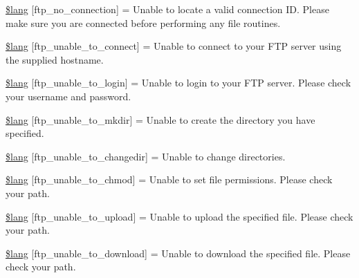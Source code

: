 \begin{DoxyCompactItemize}
\item 
\mbox{\hyperlink{ftp__lang_8php_af32ae700eb8c6446a6b393f025207123}{\$lang}} \mbox{[}\textquotesingle{}ftp\+\_\+no\+\_\+connection\textquotesingle{}\mbox{]} = \textquotesingle{}Unable to locate a valid connection I\+D. Please make sure you are connected before performing any file routines.\textquotesingle{}
\item 
\mbox{\hyperlink{ftp__lang_8php_a5a2916d207a12fc234432617f6bfe16c}{\$lang}} \mbox{[}\textquotesingle{}ftp\+\_\+unable\+\_\+to\+\_\+connect\textquotesingle{}\mbox{]} = \textquotesingle{}Unable to connect to your F\+TP server using the supplied hostname.\textquotesingle{}
\item 
\mbox{\hyperlink{ftp__lang_8php_ab8accd066e5113d6964f8a66bffadd2b}{\$lang}} \mbox{[}\textquotesingle{}ftp\+\_\+unable\+\_\+to\+\_\+login\textquotesingle{}\mbox{]} = \textquotesingle{}Unable to login to your F\+TP server. Please check your username and password.\textquotesingle{}
\item 
\mbox{\hyperlink{ftp__lang_8php_a1b9aef89edd203147bc526cad9cce4bf}{\$lang}} \mbox{[}\textquotesingle{}ftp\+\_\+unable\+\_\+to\+\_\+mkdir\textquotesingle{}\mbox{]} = \textquotesingle{}Unable to create the directory you have specified.\textquotesingle{}
\item 
\mbox{\hyperlink{ftp__lang_8php_a992dca1be963ab5d3ba070bfc2cd1cd3}{\$lang}} \mbox{[}\textquotesingle{}ftp\+\_\+unable\+\_\+to\+\_\+changedir\textquotesingle{}\mbox{]} = \textquotesingle{}Unable to change directories.\textquotesingle{}
\item 
\mbox{\hyperlink{ftp__lang_8php_a3329c4f515930936620f39a213dd3686}{\$lang}} \mbox{[}\textquotesingle{}ftp\+\_\+unable\+\_\+to\+\_\+chmod\textquotesingle{}\mbox{]} = \textquotesingle{}Unable to set file permissions. Please check your path.\textquotesingle{}
\item 
\mbox{\hyperlink{ftp__lang_8php_ae1f02f1304d517603128c96c70b7209b}{\$lang}} \mbox{[}\textquotesingle{}ftp\+\_\+unable\+\_\+to\+\_\+upload\textquotesingle{}\mbox{]} = \textquotesingle{}Unable to upload the specified file. Please check your path.\textquotesingle{}
\item 
\mbox{\hyperlink{ftp__lang_8php_ab5260548d1d2c2964dd03977903aff36}{\$lang}} \mbox{[}\textquotesingle{}ftp\+\_\+unable\+\_\+to\+\_\+download\textquotesingle{}\mbox{]} = \textquotesingle{}Unable to download the specified file. Please check your path.\textquotesingle{}
\item 

\end{DoxyCompactItemize}
